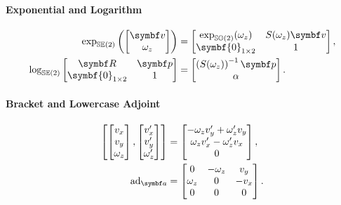 \begin{properties}[breakable, title={$\SEtwo$ formula sheet}]
  \paragraph{Exponential and Logarithm}
  \begin{align}
    \exp_\SEtwo \left(\begin{bmatrix} \bv \\ \omega_{z} \end{bmatrix} \right) & =  \begin{bmatrix}
      \exp_{\SOtwo} (\omega_z) & S(\omega_z)\bv \\ \symbf{0}_{1 \times 2} & 1
    \end{bmatrix}, \\
    \log_\SEtwo \begin{bmatrix} \bR & \bp \\ \symbf{0}_{1 \times 2} & 1 \end{bmatrix}               & = \begin{bmatrix} \left( S(\omega_z) \right)^{-1} \bp \\ \alpha \end{bmatrix}.
  \end{align}

  \paragraph{Bracket and Lowercase Adjoint}
  \begin{equation}
    \begin{aligned}
      \left[
        \begin{bmatrix} v_{x} \\ v_{y} \\ \omega_{z} \end{bmatrix},     \begin{bmatrix} v_{x}' \\ v_{y}' \\ \omega_{z}' \end{bmatrix}
      \right] & = \begin{bmatrix} -\omega_{z} \v_{y}' + \omega_{z}' v_{y} \\ \omega_{z} v_{x}' - \omega_{z}' v_{x} \\ 0 \end{bmatrix},  \\
      \ad_\a  & =  \begin{bmatrix}  0 & -\omega_z & v_y \\ \omega_z & 0 & -v_x \\ 0 & 0 & 0 \end{bmatrix}.
    \end{aligned}
  \end{equation}


\end{properties}
